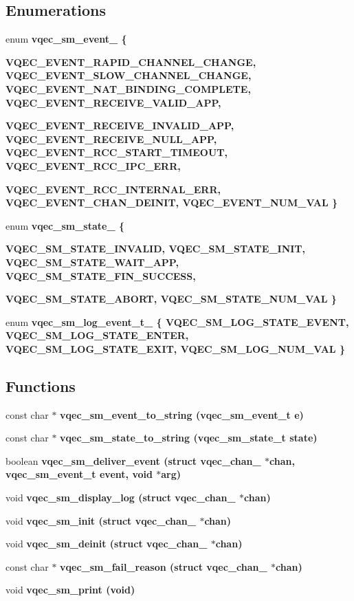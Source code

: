 \subsection*{Enumerations}
\begin{CompactItemize}
\item 
enum \bf{vqec\_\-sm\_\-event\_\-} \{ \par
\bf{VQEC\_\-EVENT\_\-RAPID\_\-CHANNEL\_\-CHANGE}, 
\bf{VQEC\_\-EVENT\_\-SLOW\_\-CHANNEL\_\-CHANGE}, 
\bf{VQEC\_\-EVENT\_\-NAT\_\-BINDING\_\-COMPLETE}, 
\bf{VQEC\_\-EVENT\_\-RECEIVE\_\-VALID\_\-APP}, 
\par
\bf{VQEC\_\-EVENT\_\-RECEIVE\_\-INVALID\_\-APP}, 
\bf{VQEC\_\-EVENT\_\-RECEIVE\_\-NULL\_\-APP}, 
\bf{VQEC\_\-EVENT\_\-RCC\_\-START\_\-TIMEOUT}, 
\bf{VQEC\_\-EVENT\_\-RCC\_\-IPC\_\-ERR}, 
\par
\bf{VQEC\_\-EVENT\_\-RCC\_\-INTERNAL\_\-ERR}, 
\bf{VQEC\_\-EVENT\_\-CHAN\_\-DEINIT}, 
\bf{VQEC\_\-EVENT\_\-NUM\_\-VAL}
 \}
\item 
enum \bf{vqec\_\-sm\_\-state\_\-} \{ \par
\bf{VQEC\_\-SM\_\-STATE\_\-INVALID}, 
\bf{VQEC\_\-SM\_\-STATE\_\-INIT}, 
\bf{VQEC\_\-SM\_\-STATE\_\-WAIT\_\-APP}, 
\bf{VQEC\_\-SM\_\-STATE\_\-FIN\_\-SUCCESS}, 
\par
\bf{VQEC\_\-SM\_\-STATE\_\-ABORT}, 
\bf{VQEC\_\-SM\_\-STATE\_\-NUM\_\-VAL}
 \}
\item 
enum \bf{vqec\_\-sm\_\-log\_\-event\_\-t\_\-} \{ \bf{VQEC\_\-SM\_\-LOG\_\-STATE\_\-EVENT}, 
\bf{VQEC\_\-SM\_\-LOG\_\-STATE\_\-ENTER}, 
\bf{VQEC\_\-SM\_\-LOG\_\-STATE\_\-EXIT}, 
\bf{VQEC\_\-SM\_\-LOG\_\-NUM\_\-VAL}
 \}
\end{CompactItemize}
\subsection*{Functions}
\begin{CompactItemize}
\item 
const char $\ast$ \bf{vqec\_\-sm\_\-event\_\-to\_\-string} (\bf{vqec\_\-sm\_\-event\_\-t} e)
\item 
const char $\ast$ \bf{vqec\_\-sm\_\-state\_\-to\_\-string} (\bf{vqec\_\-sm\_\-state\_\-t} state)
\item 
boolean \bf{vqec\_\-sm\_\-deliver\_\-event} (struct \bf{vqec\_\-chan\_\-} $\ast$chan, \bf{vqec\_\-sm\_\-event\_\-t} event, void $\ast$arg)
\item 
void \bf{vqec\_\-sm\_\-display\_\-log} (struct \bf{vqec\_\-chan\_\-} $\ast$chan)
\item 
void \bf{vqec\_\-sm\_\-init} (struct \bf{vqec\_\-chan\_\-} $\ast$chan)
\item 
void \bf{vqec\_\-sm\_\-deinit} (struct \bf{vqec\_\-chan\_\-} $\ast$chan)
\item 
const char $\ast$ \bf{vqec\_\-sm\_\-fail\_\-reason} (struct \bf{vqec\_\-chan\_\-} $\ast$chan)
\item 
void \bf{vqec\_\-sm\_\-print} (void)
\end{CompactItemize}


